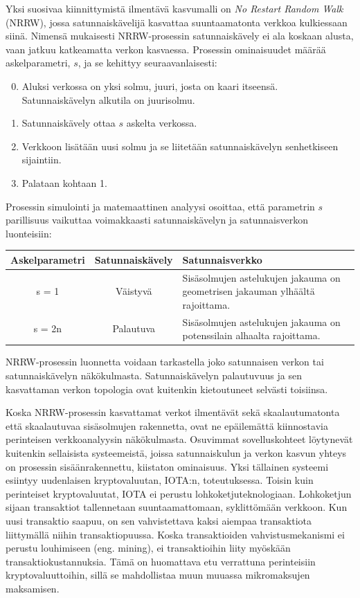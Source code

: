 \documentclass[finnish, 12pt, a4paper, sci, utf8, pdfa]{aaltothesis}
\begin{document}
Yksi suosivaa kiinnittymistä ilmentävä kasvumalli on \textit{No Restart Random Walk} (NRRW), jossa satunnaiskävelijä kasvattaa suuntaamatonta verkkoa kulkiessaan siinä. Nimensä 
mukaisesti NRRW-prosessin satunnaiskävely ei ala koskaan alusta, vaan jatkuu katkeamatta verkon kasvaessa. Prosessin ominaisuudet määrää askelparametri, $ s $, ja se kehittyy seuraavanlaisesti:
\begin{enumerate}[noitemsep]
   \setcounter{enumi}{-1}
   \item Aluksi verkossa on yksi solmu, juuri, josta on kaari itseensä. Satunnaiskävelyn alkutila on juurisolmu.
   \item Satunnaiskävely ottaa $ s $ askelta verkossa.
   \item Verkkoon lisätään uusi solmu ja se liitetään satunnaiskävelyn senhetkiseen sijaintiin.
   \item Palataan kohtaan 1.
\end{enumerate}
Prosessin simulointi ja matemaattinen analyysi osoittaa, että parametrin $ s $ parillisuus vaikuttaa voimakkaasti satunnaiskävelyn ja satunnaisverkon luonteisiin:
\begin{table}[htb]
   \begin{center}
   \begin{tabular}{|c|c|p{7.5cm}|}
   \hline
   \textbf{Askelparametri} & \textbf{Satunnaiskävely} & \textbf{Satunnaisverkko} \\ \hline
   s = 1          & Väistyvä        & Sisäsolmujen astelukujen jakauma on geometrisen jakauman ylhäältä rajoittama. \\ \hline
   s = 2n         & Palautuva       & Sisäsolmujen astelukujen jakauma on potenssilain alhaalta rajoittama. \\ \hline
   \end{tabular}
   \end{center}
\end{table}

NRRW-prosessin luonnetta voidaan tarkastella joko satunnaisen verkon tai satunnaiskävelyn näkökulmasta. Satunnaiskävelyn palautuvuus ja sen kasvattaman verkon topologia ovat 
kuitenkin kietoutuneet selvästi toisiinsa. \cite{Iacobelli}

Koska NRRW-prosessin kasvattamat verkot ilmentävät sekä skaalautumatonta että skaalautuvaa sisäsolmujen rakennetta, ovat ne epäilemättä kiinnostavia perinteisen verkkoanalyysin näkökulmasta. 
Osuvimmat sovelluskohteet löytynevät kuitenkin sellaisista systeemeistä, joissa satunnaiskulun ja verkon kasvun yhteys on prosessin sisäänrakennettu, kiistaton ominaisuus. Yksi tällainen
systeemi esiintyy uudenlaisen kryptovaluutan, IOTA:n, toteutuksessa. Toisin kuin perinteiset kryptovaluutat, IOTA ei perustu lohkoketjuteknologiaan. Lohkoketjun sijaan transaktiot 
tallennetaan suuntaamattomaan, syklittömään verkkoon. Kun uusi transaktio saapuu, on sen vahvistettava kaksi aiempaa transaktiota liittymällä niihin transaktiopuussa. Koska 
transaktioiden vahvistusmekanismi ei perustu louhimiseen (eng. mining), ei transaktioihin liity myöskään transaktiokustannuksia. Tämä on huomattava etu verrattuna perinteisiin
kryptovaluuttoihin, sillä se mahdollistaa muun muuassa mikromaksujen maksamisen. \cite{Popov-WP}
\end{document}
